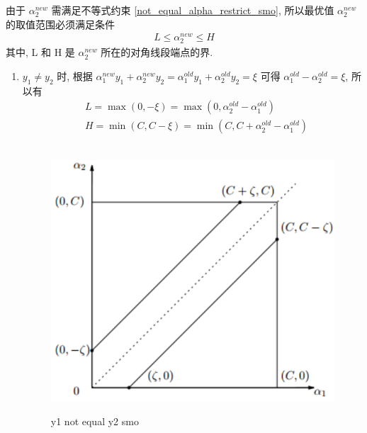 \documentclass[oneside, 12pt]{ctexbook}
\begin{document}
\begin{enumerate}
					由于 $\alpha_2^{new}$ 需满足不等式约束 \ref{not_equal_alpha_restrict_smo}, 所以最优值 $\alpha_2^{new}$ 的取值范围必须满足条件
						\begin{align}
							L \leq \alpha_2^{new} \leq H
						\end{align}
					其中, L 和 H 是 $\alpha_2^{new}$ 所在的对角线段端点的界. 
						\begin{enumerate}
							\item $y_1 \neq y_2$ 时, 根据 $\alpha_1^{new} y_1 + \alpha_2^{new} y_2 = \alpha_1^{old} y_1 + \alpha_2^{old} y_2 = \xi$ 可得 $\alpha_1^{old} - \alpha_2^{old} = \xi$, 所以有
								\begin{align}
									&L = \max(0, -\xi) = \max(0, \alpha_2^{old} - \alpha_1^{old})\\
									&H = \min(C, C-\xi) = \min(C, C + \alpha_2^{old} - \alpha_1^{old})
								\end{align}
								\begin{figure}[H]	
									\vspace{-0.2cm}  %
									\setlength{\abovecaptionskip}{-0.2cm}   %
									\centering
									\includegraphics[scale=0.8]{y_1_not_equal_y_2_smo.png}
									\renewcommand{\figurename}{Fig} %
									\caption{y1 not equal y2 smo}
									\label{y_1_not_equal_y_2_smo}
								\end{figure}
							

\end{enumerate}
\end{enumerate}
\end{document}
